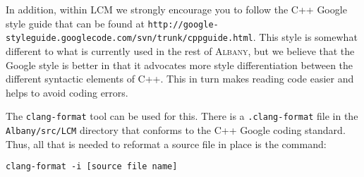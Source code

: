 \documentclass{article}
\newcommand{\albany}{\textsc{Albany}}
\newcommand{\lcm}{\textsc{LCM}}
\begin{document}
In addition, within \lcm{} we strongly encourage you to follow the C++
Google style guide that can be found at
\verb+http://google-styleguide.googlecode.com/svn/trunk/cppguide.html+.
This style is somewhat different to what is currently used in the rest
of \albany{}, but we believe that the Google style is better in that
it advocates more style differentiation between the different
syntactic elements of C++. This in turn makes reading code easier and
helps to avoid coding errors.

The \verb+clang-format+ tool can be used for this. There is a
\verb+.clang-format+ file in the \verb+Albany/src/LCM+ directory that conforms
to the C++ Google coding standard. Thus, all that is needed to reformat a
source file in place is the command:
\begin{verbatim}
clang-format -i [source file name]
\end{verbatim}
\end{document}
